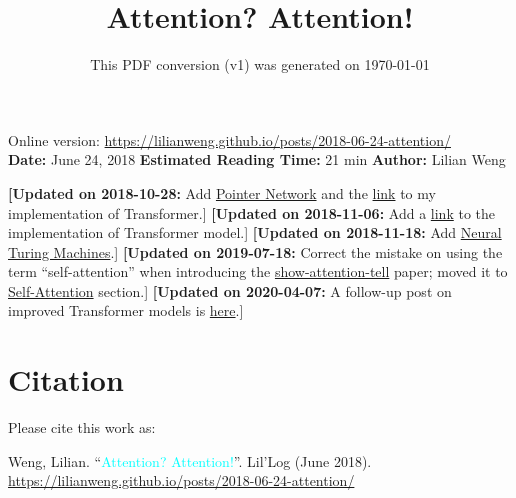 \documentclass[12pt]{article}
\title{Attention? Attention!}
\date{This PDF conversion (v1) was generated on \today\footnotemark}
\begin{document}
\maketitle
\begin{center}
    Online version: \url{https://lilianweng.github.io/posts/2018-06-24-attention/} \\
    \textbf{Date:} June 24, 2018 \quad
    \textbf{Estimated Reading Time:} 21 min \quad
    \textbf{Author:} Lilian Weng
\end{center}

\textbf{[Updated on 2018-10-28:} Add \hyperref[pointer-network]{Pointer Network} and the \href{https://github.com/lilianweng/transformer-tensorflow}{link} to my implementation of Transformer.]
\newline
\textbf{[Updated on 2018-11-06:} Add a \href{https://github.com/lilianweng/transformer-tensorflow}{link} to the implementation of Transformer model.]
\newline
\textbf{[Updated on 2018-11-18:} Add \hyperref[neural-turing-machines]{Neural Turing Machines}.]
\newline
\textbf{[Updated on 2019-07-18:} Correct the mistake on using the term ``self-attention'' when introducing the \href{https://arxiv.org/abs/1502.03044}{show-attention-tell} paper; moved it to \hyperref[self-attention]{Self-Attention} section.]
\newline
\textbf{[Updated on 2020-04-07:} A follow-up post on improved Transformer models is \href{https://lilianweng.github.io/posts/2020-04-07-the-transformer-family/}{here}.]


\newpage
\tableofcontents
\newpage
\vspace{1em}
\n\n\n\section*{Citation}
Please cite this work as:

\begin{tcolorbox}[colback=black!5!white, colframe=black!80!white, boxrule=0.5pt, arc=2mm, left=1mm, right=1mm, top=1mm, bottom=1mm]
  Weng, Lilian. ``\textcolor{cyan}{Attention? Attention!}''. Lil'Log (June 2018). \href{https://lilianweng.github.io/posts/2018-06-24-attention/}{https://lilianweng.github.io/posts/2018-06-24-attention/}
\end{tcolorbox}
\end{document}
